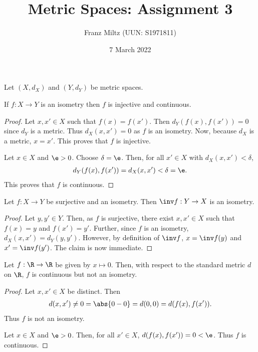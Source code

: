 \documentclass{article}
\begin{document}
\title{Metric Spaces: Assignment 3}
\author{Franz Miltz (UUN: S1971811)}
\date{7 March 2022}
\maketitle

Let $(X,d_X)$ and $(Y,d_Y)$ be metric spaces.

\begin{claim*}[1a]
	If $f:X\to Y$ is an isometry then $f$ is injective and continuous.
	\begin{proof}
		Let $x,x'\in X$ such that $f(x)=f(x')$. Then $d_Y(f(x),f(x'))=0$ since $d_Y$ is a metric.
		Thus $d_X(x,x')=0$ as $f$ is an isometry. Now, because $d_X$ is a metric, $x=x'$. This proves
		that $f$ is injective.

		Let $x\in X$ and $\e>0$. Choose $\delta=\e$. Then, for all $x'\in X$ with $d_X(x,x')<\delta$,
		\begin{align*}
			d_Y(f(x),f(x')) = d_X(x,x') < \delta = \e.
		\end{align*}
		This proves that $f$ is continuous.
	\end{proof}
\end{claim*}

\begin{claim*}[1b]
	Let $f:X\to Y$ be surjective and an isometry. Then $\inv f:Y\to X$ is an isometry.
	\begin{proof}
		Let $y,y'\in Y$. Then, as $f$ is surjective, there exist $x,x'\in X$ such that
		$f(x)=y$ and $f(x')=y'$. Further, since $f$ is an isometry, $d_X(x,x')=d_Y(y,y')$.
		However, by definition of $\inv f$, $x=\inv f(y)$ and $x'=\inv f(y')$. The claim is
		now immediate.
	\end{proof}
\end{claim*}

\begin{claim*}[2]
	Let $f:\R\to \R$ be given by $x\mapsto 0$. Then, with respect to the standard metric
	$d$ on $\R$, $f$ is continuous but not an isometry.
	\begin{proof}
		Let $x,x'\in X$ be distinct. Then
		\begin{align*}
			d(x,x') \not= 0 = \abs{0-0} = d(0, 0) = d(f(x), f(x')).
		\end{align*}
		Thus $f$ is not an isometry.

		Let $x\in X$ and $\e>0$. Then, for all $x'\in X$, $d(f(x),f(x'))=0<\e$.
		Thus $f$ is continuous.
	\end{proof}
\end{claim*}
\end{document}
